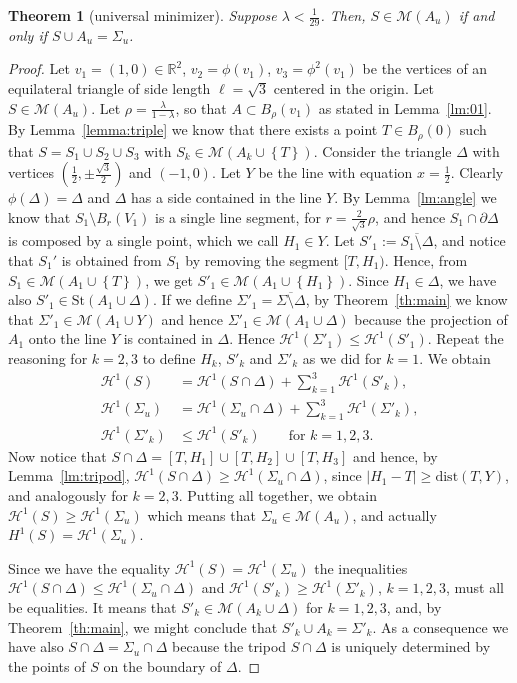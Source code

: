 \documentclass{amsart}
\newcommand{\RR}{\mathbb R}
\renewcommand{\H}{\mathcal H}
\newcommand{\abs}[1]{\left\vert #1 \right\vert}
\newcommand{\enclose}[1]{\left(#1\right)}
\newcommand{\ENCLOSE}[1]{\left\{#1\right\}}
\newcommand{\St}{\mathrm{St}}
\newcommand{\M}{\mathcal{M}}
\renewcommand{\H}{\mathcal{H}}
\newcommand{\dist}{\mathrm{dist}}
\newtheorem{theorem}{Theorem}[section]
\theoremstyle{definition}
\theoremstyle{remark}
\begin{document}
\begin{theorem}[universal minimizer]\label{th:universal}
  Suppose $\lambda < \frac 1{29}$.
  Then, $S \in \M(A_u)$ if and only if $S\cup A_u = \Sigma_u$.
\end{theorem}
\begin{proof}
  Let $v_1 = (1,0)\in \RR^2$, $v_2=\phi(v_1)$, $v_3=\phi^2(v_1)$ 
  be the vertices of an equilateral 
  triangle of side length $\ell = \sqrt 3$ centered in the origin.
  Let $S\in \M(A_u)$.
  Let $\rho = \frac{\lambda}{1-\lambda}$, so that $A\subset B_\rho(v_1)$ as 
  stated in Lemma~\ref{lm:01}.
  By Lemma~\ref{lemma:triple} we know that there exists a point 
  $T\in B_\rho(0)$ such that $S=S_1\cup S_2\cup S_3$ with $S_k\in \M(A_k\cup \ENCLOSE{T})$.
  Consider the triangle $\Delta$ 
  with vertices $\enclose{\frac 1 2,\pm\frac{\sqrt 3}{2}}$ and $\enclose{-1,0}$.
  Let $Y$ be the line with equation $x=\frac 1 2$.
  Clearly $\phi(\Delta)=\Delta$ and $\Delta$ has a side contained in the line $Y$. 
  By Lemma~\ref{lm:angle} we know that $S_1\setminus B_r(V_1)$ is a single line segment,
  for $r=\frac 2 {\sqrt 3} \rho$,
  and hence $S_1\cap \partial \Delta$ is composed by a single point, 
  which we call $H_1\in Y$. 
  Let $S'_1 := \overline{S_1\setminus \Delta}$, and notice that
  $S_1'$ is obtained from $S_1$ by removing the segment $[T,H_1)$.
  Hence, from $S_1\in \M(A_1\cup \ENCLOSE{T})$, we get $S'_1\in \M(A_1\cup \ENCLOSE{H_1})$. 
  Since $H_1\in \Delta$, we have also $S'_1\in \St(A_1 \cup \Delta)$.
  If we define $\Sigma'_1 = \overline{\Sigma\setminus \Delta}$,
  by Theorem~\ref{th:main} we know that $\Sigma'_1 \in \M(A_1\cup Y)$ 
  and hence $\Sigma'_1 \in \M(A_1\cup \Delta)$ because the projection of $A_1$ onto the line 
  $Y$ is contained in $\Delta$. 
  Hence $\H^1(\Sigma'_1)\le \H^1(S'_1)$.
  Repeat the reasoning for $k=2,3$ to define $H_k$, $S'_k$ and $\Sigma'_k$
  as we did for $k=1$.
  We obtain
  \begin{align*}
    \H^1(S) &= \H^1(S\cap \Delta) + \sum_{k=1}^3 \H^1(S'_k),\\
    \H^1(\Sigma_u) &= \H^1(\Sigma_u\cap \Delta) + \sum_{k=1}^3 \H^1(\Sigma'_k),\\
    \H^1(\Sigma'_k) & \le \H^1(S'_k) \qquad \text{for $k=1,2,3$}.
  \end{align*}
  Now notice that $S\cap \Delta = [T,H_1]\cup [T,H_2]\cup [T,H_3]$
  and hence, by Lemma~\ref{lm:tripod}, $\H^1(S\cap \Delta) \ge \H^1(\Sigma_u\cap \Delta)$,
  since $\abs{H_1 - T}\ge \dist(T,Y)$, and analogously for $k=2,3$.
  Putting all together, we obtain $\H^1(S)\ge \H^1(\Sigma_u)$
  which means that $\Sigma_u\in \M(A_u)$, and actually $H^1(S)=\H^1(\Sigma_u)$.

  Since we have the equality $\H^1(S)=\H^1(\Sigma_u)$ the inequalities 
  $\H^1(S\cap \Delta)\le \H^1(\Sigma_u\cap \Delta)$ and
  $\H^1(S'_k)\ge \H^1(\Sigma'_k)$, $k=1,2,3$, must all be equalities.
  It means that $S'_k\in \M(A_k\cup \Delta)$ for $k=1,2,3$, and,
  by Theorem~\ref{th:main}, we might conclude that $S'_k\cup A_k = \Sigma'_k$.
  As a consequence we have also $S\cap \Delta = \Sigma_u\cap \Delta$ because 
  the tripod $S\cap \Delta$ is uniquely determined by the points of $S$ on 
  the boundary of $\Delta$.
\end{proof}
\end{document}
